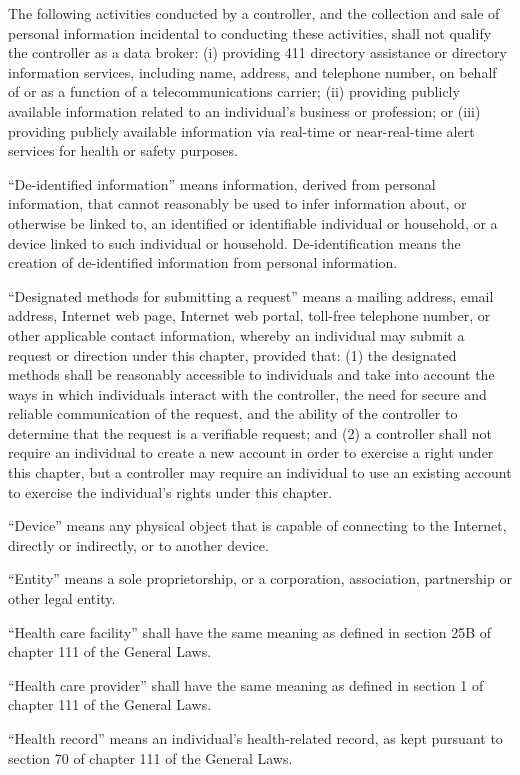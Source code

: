 The following activities conducted by a controller, and the collection and sale of personal information incidental to conducting these activities, shall not qualify the controller as a data broker: (i) providing 411 directory assistance or directory information services, including name, address, and telephone number, on behalf of or as a function of a telecommunications carrier; (ii) providing publicly available information related to an individual’s business or profession; or (iii) providing publicly available information via real-time or near-real-time alert services for health or safety purposes.

“De-identified information” means information, derived from personal information, that cannot reasonably be used to infer information about, or otherwise be linked to, an identified or identifiable individual or household, or a device linked to such individual or household. De-identification means the creation of de-identified information from personal information.

“Designated methods for submitting a request” means a mailing address, email address, Internet web page, Internet web portal, toll-free telephone number, or other applicable contact information, whereby an individual may submit a request or direction under this chapter, provided that: (1) the designated methods shall be reasonably accessible to individuals and take into account the ways in which individuals interact with the controller, the need for secure and reliable communication of the request, and the ability of the controller to determine that the request is a verifiable request; and (2) a controller shall not require an individual to create a new account in order to exercise a right under this chapter, but a controller may require an individual to use an existing account to exercise the individual’s rights under this chapter.

“Device” means any physical object that is capable of connecting to the Internet, directly or indirectly, or to another device.

“Entity” means a sole proprietorship, or a corporation, association, partnership or other legal entity.

“Health care facility” shall have the same meaning as defined in section 25B of chapter 111 of the General Laws.

“Health care provider” shall have the same meaning as defined in section 1 of chapter 111 of the General Laws.

“Health record” means an individual’s health-related record, as kept pursuant to section 70 of chapter 111 of the General Laws.

